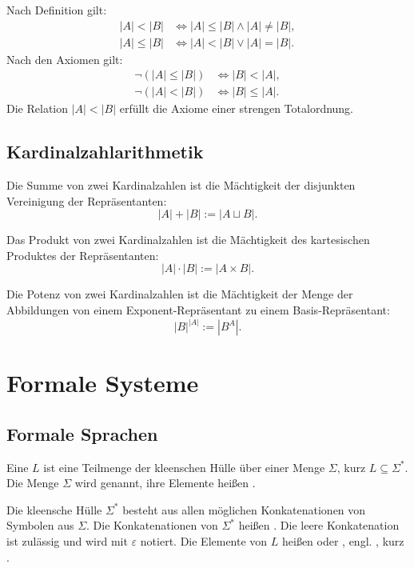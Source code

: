 Nach Definition gilt:
\begin{align}
|A|<|B| &\iff |A|\le |B|\land |A|\ne |B|,\\
|A|\le |B| &\iff |A|<|B|\lor |A|=|B|.
\end{align}
Nach den Axiomen gilt:
\begin{align}
\neg (|A|\le |B|) &\iff |B|<|A|,\\
\neg (|A|<|B|) &\iff |B|\le |A|.
\end{align}
Die Relation $|A|<|B|$ erfüllt die Axiome einer
strengen Totalordnung.

\subsection{Kardinalzahlarithmetik}
\begin{definition}
Die Summe von zwei Kardinalzahlen ist die Mächtigkeit
der disjunkten Vereinigung der Repräsentanten:%
\begin{equation}
|A|+|B| := |A\sqcup B|.
\end{equation}
\end{definition}

\begin{definition}
Das Produkt von zwei Kardinalzahlen ist die Mächtigkeit
des kartesischen Produktes der Repräsentanten:%
\begin{equation}
|A|\cdot |B| := |A\times B|.
\end{equation}
\end{definition}

\begin{definition}
Die Potenz von zwei Kardinalzahlen ist die Mächtigkeit
der Menge der Abbildungen von einem Exponent-Repräsentant
zu einem Basis-Repräsentant:%
\begin{equation}
|B|^{|A|} := |B^A|.
\end{equation}
\end{definition}

\newpage
\section{Formale Systeme}
\subsection{Formale Sprachen}
\begin{definition}
Eine  $L$ ist eine Teilmenge der kleenschen
Hülle über einer Menge $\Sigma$, kurz $L\subseteq\Sigma^*$.
Die Menge $\Sigma$ wird  genannt,
ihre Elemente heißen .

Die kleensche Hülle $\Sigma^*$ besteht aus allen möglichen
Konkatenationen von Symbolen aus $\Sigma$. Die Konkatenationen
von $\Sigma^*$ heißen . Die leere Konkatenation ist
zulässig und wird mit $\varepsilon$ notiert. Die Elemente von $L$ heißen
 oder ,
engl. , kurz .
\end{definition}

